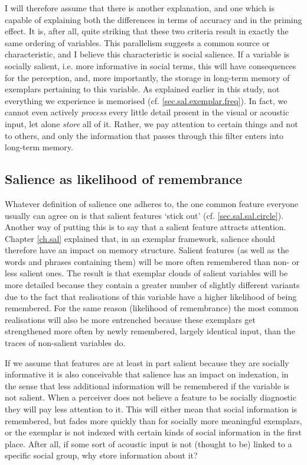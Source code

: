 I will therefore assume that there is another explanation, and one which is capable of explaining both the differences in terms of accuracy and in the priming effect.
It is, after all, quite striking that these two criteria result in exactly the same ordering of variables.
This parallelism suggests a common source or characteristic, and I believe this characteristic is social salience.
If a variable is socially salient, i.e. more informative in social terms, this will have consequences for the perception, and, more importantly, the storage in long-term memory of exemplars pertaining to this variable.
As explained earlier in this study, not everything we experience is memorised (cf. \ref{sec.sal.exemplar.freq}).
In fact, we cannot even actively \emph{process} every little detail present in the visual or acoustic input, let alone \emph{store} all of it.
Rather, we pay attention to certain things and not to others, and only the information that passes through this filter enters into long-term memory.

		\subsection{Salience as likelihood of remembrance}

Whatever definition of salience one adheres to, the one common feature everyone usually can agree on is that salient features `stick out' (cf. \ref{sec.sal.sal.circle}).
Another way of putting this is to say that a salient feature attracts attention.
Chapter \ref{ch.sal} explained that, in an exemplar framework, salience should therefore have an impact on memory structure.
Salient features (as well as the words and phrases containing them) will be more often remembered than non- or less salient ones.
The result is that exemplar clouds of salient variables will be more detailed because they contain a greater number of slightly different variants due to the fact that realisations of this variable have a higher likelihood of being remembered.
For the same reason (likelihood of remembrance) the most common realisations will also be more entrenched because these exemplars get strengthened more often by newly remembered, largely identical input, than the traces of non-salient variables do.

If we assume that features are at least in part salient because they are socially informative it is also conceivable that salience has an impact on indexation, in the sense that less additional information will be remembered if the variable is not salient.
When a perceiver does not believe a feature to be socially diagnostic they will pay less attention to it.
This will either mean that social information is remembered, but fades more quickly than for socially more meaningful exemplars, or the exemplar is not indexed with certain kinds of social information in the first place.
After all, if some sort of acoustic input is not (thought to be) linked to a specific social group, why store information about it?

